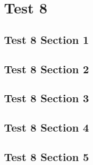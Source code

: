 \chapter{Test 8}
\localtableofcontents
\clearpage

\section{Test 8 Section 1}

\linebreak

\section{Test 8 Section 2}

\linebreak

\section{Test 8 Section 3}

\linebreak

\section{Test 8 Section 4}

\linebreak

\section{Test 8 Section 5}

\linebreak